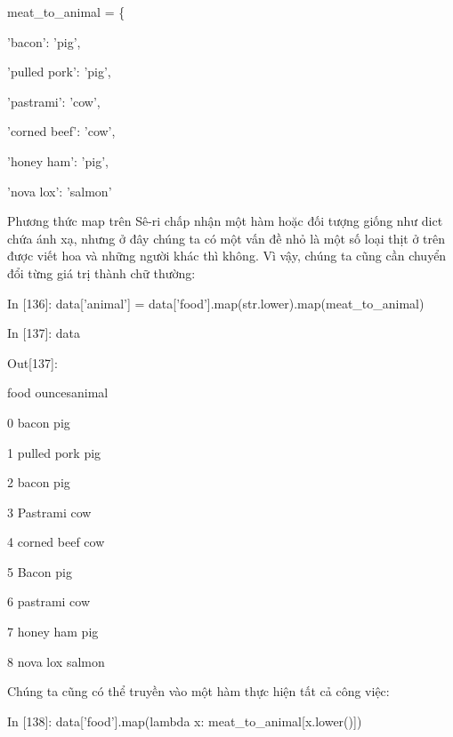     \quad\textup{ \textup{meat\_to\_animal} = \{ }\par
    \quad\quad\textup{'bacon': 'pig',  }\par
    \quad\quad\textup{'pulled pork': 'pig',  }\par
    \quad\quad\textup{'pastrami': 'cow',  }\par
    \quad\quad\textup{'corned beef': 'cow', }\par 
    \quad\quad\textup{'honey ham': 'pig', }\par 
    \quad\quad\textup{'nova lox': 'salmon'  }\par  
Phương thức map trên Sê-ri chấp nhận một hàm hoặc đối tượng giống như dict chứa ánh xạ, 
nhưng ở đây chúng ta có một vấn đề nhỏ là một số loại thịt ở trên được viết hoa và 
những người khác thì không. Vì vậy, chúng ta cũng cần chuyển đổi từng giá trị thành chữ thường:\par
    \quad\textup{ In [136]: data['animal'] = data['food'].map(str.lower).map(meat\_to\_animal)  }\par
    \quad\textup{In [137]: data }\par
    \quad\textup{Out[137]:  }\par
    \quad\textup{\quad\quad food \quad\quad ounces\quad animal  }\par
    \quad\textup{0        bacon  \quad   \quad{} \quad\quad\quad    pig  }\par
    \quad\textup{1  pulled pork    \quad\quad\quad   pig  }\par
    \quad\textup{2        bacon    \quad\quad{}    \quad\quad\quad pig  }\par
    \quad\textup{3     Pastrami    \quad {}\quad\quad\quad     cow  }\par
    \quad\textup{4  corned beef     \quad\quad\quad    cow  }\par
    \quad\textup{5        Bacon    \quad \quad{} \quad\quad\quad    pig }\par
    \quad\textup{6     pastrami    \quad{} \quad\quad\quad    cow  }\par
    \quad\textup{7    honey ham      \quad\quad\quad   pig  }\par
    \quad\textup{8     nova lox     \quad{}\quad\quad\quad salmon }\par
Chúng ta cũng có thể truyền vào một hàm thực hiện tất cả công việc: \par
    \quad\textup{In [138]: data['food'].map(lambda x: meat\_to\_animal[x.lower()]) }\par
